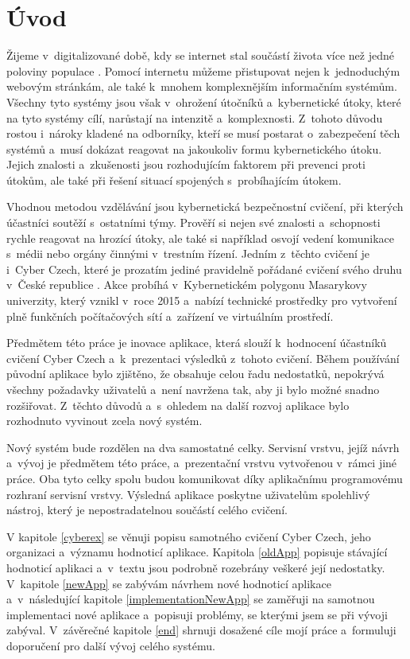 \documentclass[
  digital,
  twoside,
  table, 
  nolof, 
  nolot
]{fithesis3}
\begin{document}
\chapter{Úvod}

Žijeme v~digitalizované době, kdy se internet stal součástí života více než jedné poloviny populace \cite{worldStats}. Pomocí internetu můžeme přistupovat nejen k~jednoduchým webovým stránkám, ale také k~mnohem komplexnějším informačním systémům. Všechny tyto systémy jsou však v~ohrožení útočníků a~kybernetické útoky, které na tyto systémy cílí, narůstají na intenzitě a~komplexnosti. Z~tohoto důvodu rostou i~nároky kladené na odborníky, kteří se musí postarat o~zabezpečení těch systémů a~musí dokázat reagovat na jakoukoliv formu kybernetického útoku. Jejich znalosti a~zkušenosti jsou rozhodujícím faktorem při prevenci proti útokům, ale také při řešení situací spojených s~probíhajícím útokem.

Vhodnou metodou vzdělávání jsou kybernetická bezpečnostní cvičení, při kterých účastníci soutěží s~ostatními týmy. Prověří si nejen své znalosti a~schopnosti rychle reagovat na hrozící útoky, ale také si například osvojí vedení komunikace s~médii nebo orgány činnými v~trestním řízení. Jedním z~těchto cvičení je i~Cyber Czech, které je prozatím jediné pravidelně pořádané cvičení svého druhu v~České republice \cite{cyberex}. Akce probíhá v~Kybernetickém polygonu Masarykovy univerzity, který vznikl v~roce 2015 a~nabízí technické prostředky pro vytvoření plně funkčních počítačových sítí a~zařízení ve virtuálním prostředí.

Předmětem této práce je inovace aplikace, která slouží k~hodnocení účastníků cvičení Cyber Czech a~k~prezentaci výsledků z~tohoto cvičení. Během používání původní aplikace bylo zjištěno, že obsahuje celou řadu nedostatků, nepokrývá všechny požadavky uživatelů a~není navržena tak, aby ji bylo možné snadno rozšiřovat. Z~těchto důvodů a~s~ohledem na další rozvoj aplikace bylo rozhodnuto vyvinout zcela nový systém. 

Nový systém bude rozdělen na dva samostatné celky. Servisní vrstvu, jejíž návrh a~vývoj je předmětem této práce, a~prezentační vrstvu vytvořenou v~rámci jiné práce. Oba tyto celky spolu budou komunikovat díky aplikačnímu programovému rozhraní servisní vrstvy. Výsledná aplikace poskytne uživatelům spolehlivý nástroj, který je nepostradatelnou součástí celého cvičení. 

V kapitole \ref{cyberex} se věnuji popisu samotného cvičení Cyber Czech, jeho organizaci a~významu hodnoticí aplikace. Kapitola \ref{oldApp} popisuje stávající hodnoticí aplikaci a~v~textu jsou podrobně rozebrány veškeré její nedostatky. V~kapitole \ref{newApp} se zabývám návrhem nové hodnoticí aplikace a~v~následující kapitole \ref{implementationNewApp} se zaměřuji na samotnou implementaci nové aplikace a~popisuji problémy, se kterými jsem se při vývoji zabýval. V~závěrečné kapitole \ref{end} shrnuji dosažené cíle mojí práce a~formuluji doporučení pro další vývoj celého systému.
\end{document}
